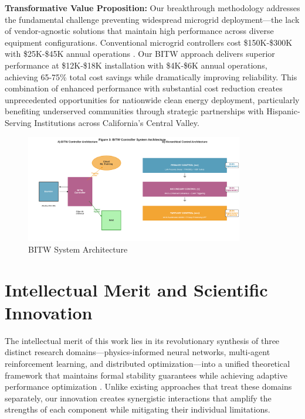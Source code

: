 \documentclass[12pt]{article}
\begin{document}
\textbf{Transformative Value Proposition:} Our breakthrough methodology addresses the fundamental challenge preventing widespread microgrid deployment---the lack of vendor-agnostic solutions that maintain high performance across diverse equipment configurations. Conventional microgrid controllers cost \$150K-\$300K with \$25K-\$45K annual operations \cite{hirsch2018,sigrin2019}. Our BITW approach delivers superior performance at \$12K-\$18K installation with \$4K-\$6K annual operations, achieving 65-75\% total cost savings while dramatically improving reliability. This combination of enhanced performance with substantial cost reduction creates unprecedented opportunities for nationwide clean energy deployment, particularly benefiting underserved communities through strategic partnerships with Hispanic-Serving Institutions across California's Central Valley.

\begin{figure}[H]
\centering
\includegraphics[width=0.85\textwidth]{figure3_system_architecture.pdf}
\caption{BITW System Architecture}
\end{figure}

\section{Intellectual Merit and Scientific Innovation}

The intellectual merit of this work lies in its revolutionary synthesis of three distinct research domains---physics-informed neural networks, multi-agent reinforcement learning, and distributed optimization---into a unified theoretical framework that maintains formal stability guarantees while achieving adaptive performance optimization \cite{bevrani2021,palizban2014}. Unlike existing approaches that treat these domains separately, our innovation creates synergistic interactions that amplify the strengths of each component while mitigating their individual limitations.
\end{document}

